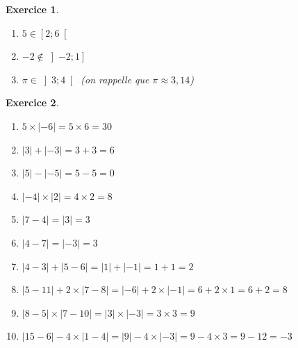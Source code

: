 \documentclass[10pt]{article}
\newtheorem{exo}{Exercice}
\begin{document}
\begin{exo}


\begin{enumerate}
\item $5\in\left[2;6\right[$
\item $-2\notin \left]-2;1\right]$
\item $\pi\in \left]3;4\right[$ (on rappelle que $\pi\approx 3,14$)
\end{enumerate}

\end{exo}

\begin{exo}

\begin{enumerate}
\item $5\times|-6|=5\times 6=30$
\item $|3|+|-3|=3+3=6$
\item $|5|-|-5|=5-5=0$
\item $|-4|\times|2|=4\times 2=8$
\item $|7-4|=|3|=3$
\item $|4-7|=|-3|=3$
\item $|4-3|+|5-6|=|1|+|-1|=1+1=2$
\item $|5-11|+2\times|7-8|=|-6|+2\times |-1|=6+2\times 1=6+2=8$
\item $|8-5|\times |7-10|=|3|\times |-3|=3\times 3=9$
\item $|15-6|-4\times|1-4|=|9|-4\times |-3|=9-4\times 3=9-12=-3$
\end{enumerate}
\end{exo}
\end{document}
